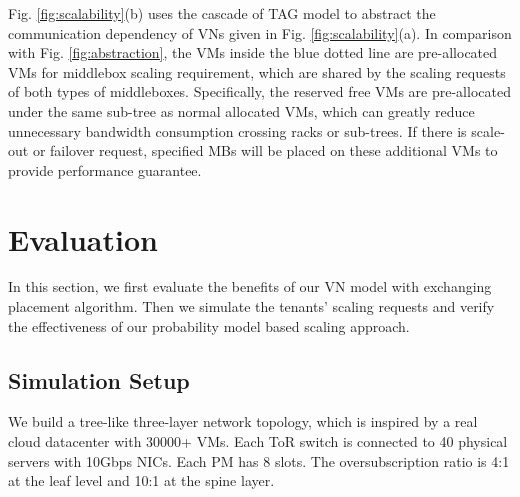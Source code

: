\documentclass[review]{elsarticle}
\begin{document}
Fig. \ref{fig:scalability}(b) uses the cascade of TAG model to abstract the communication dependency of VNs given in Fig. \ref{fig:scalability}(a). In comparison with Fig. \ref{fig:abstraction}, the VMs inside the blue dotted line are pre-allocated VMs for middlebox scaling requirement, which are shared by the scaling requests of both types of middleboxes.
Specifically, the reserved free VMs are pre-allocated under the same sub-tree as normal allocated VMs, which can greatly reduce unnecessary  bandwidth consumption crossing racks or sub-trees. If there is scale-out or failover request, specified MBs will be placed on these additional VMs to provide performance guarantee. %




\section{Evaluation}\label{sec:simulation}

In this section, we first evaluate the benefits of our VN model with exchanging placement algorithm. Then we simulate the tenants' scaling requests and verify the effectiveness of our probability model based scaling approach.





\subsection{Simulation Setup}
We build a tree-like three-layer network topology, which is inspired by a real cloud datacenter with 30000+ VMs. Each ToR switch is connected to 40 physical servers with 10Gbps NICs. 
Each PM has 8 slots.
The oversubscription ratio is 4:1 at the leaf level and 10:1 at the spine layer.  




\end{document}
